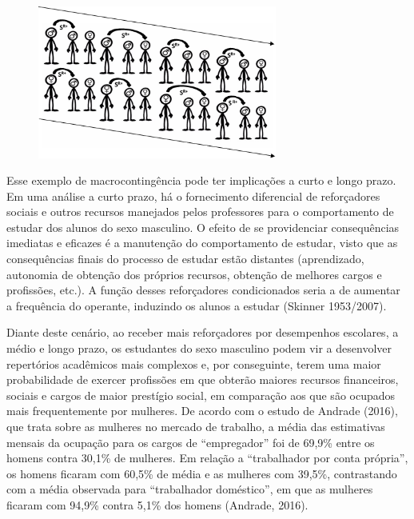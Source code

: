 \begin{figure}[ht]
    \begin{center}
        \includegraphics[width=0.7\textwidth]{7/figura1}
        \label{figura1}
\end{center}
\end{figure}

Esse exemplo de macrocontingência pode ter implicações a curto e longo prazo. Em uma análise a curto prazo, há o fornecimento diferencial de reforçadores sociais e outros recursos manejados pelos professores para o comportamento de estudar dos alunos do sexo masculino. O efeito de se providenciar consequências imediatas e eficazes é a manutenção do comportamento de estudar, visto que as consequências finais do processo de estudar estão distantes (aprendizado, autonomia de obtenção dos próprios recursos, obtenção de melhores cargos e profissões, etc.). A função desses reforçadores condicionados seria a de aumentar a frequência do operante, induzindo os alunos a estudar (Skinner 1953/2007).

Diante deste cenário, ao receber mais reforçadores por desempenhos escolares, a médio e longo prazo, os estudantes do sexo masculino podem vir a desenvolver repertórios acadêmicos mais complexos e, por conseguinte, terem uma maior probabilidade de exercer profissões em que obterão maiores recursos financeiros, sociais e cargos de maior prestígio social, em comparação aos que são ocupados mais frequentemente por mulheres. De acordo com o estudo de Andrade (2016), que trata sobre as mulheres no mercado de trabalho, a média das estimativas mensais da ocupação para os cargos de “empregador” foi de 69,9\% entre os homens contra 30,1\% de mulheres. Em relação a “trabalhador por conta própria”, os homens ficaram com 60,5\% de média e as mulheres com 39,5\%, contrastando com a média observada para “trabalhador doméstico”, em que as mulheres ficaram com 94,9\% contra 5,1\% dos homens (Andrade, 2016).

